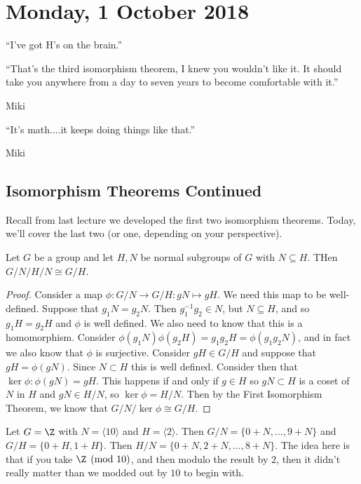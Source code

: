 \section{Monday, 1 October 2018}

\epigraph{``I've got H's on the brain.''}{}

\epigraph{``That's the third isomorphism theorem, I knew you wouldn't like it. It should take you anywhere from a day to seven years to become comfortable with it.''}{Miki}

\epigraph{``It's math....it keeps doing things like that.''}{Miki}

\subsection{Isomorphism Theorems Continued}

Recall from last lecture we developed the first two isomorphism theorems. Today, we'll cover the last two (or one, depending on your perspective).

\begin{theorem}
Let $G$ be a group and let $H,N$ be normal subgroups of $G$ with $N \subseteq H$. THen $G/N \big/ H/N \cong G/H$.
\end{theorem}

\begin{proof}
Consider a map $\phi : G/N \to G/H : gN \mapsto gH$. We need this map to be well-defined. Suppose that $g_1N = g_2N$. Then $g_1^{-1}g_2 \in N$, but $N \subseteq H$, and so $g_1H = g_2H$ and $\phi$ is well defined. We also need to know that this is a homomorphism. Consider $\phi(g_1N)\phi(g_2H) = g_1g_2H = \phi(g_1g_2N)$, and in fact we also know that $\phi$ is surjective. Consider $gH \in G/H$ and suppose that $gH = \phi(gN)$. Since $N \subset H$ this is well defined. Consider then that $\ker \phi : \phi(gN) = gH$. This happens if and only if $g \in H$ so $gN \subset H$ is a coset of $N$ in $H$ and $gN \in H/N$, so $\ker\phi = H/N$. Then by the First Isomorphism Theorem, we know that $G/N \big/ \ker\phi \cong G/H$.
\end{proof}

\begin{example}
Let $G = \Z$ with $N = \langle 10 \rangle$ and $H = \langle 2 \rangle$. Then $G/N = \{0 + N,\dotsc,9+N\}$ and $G/H = \{0 + H, 1 + H\}$. Then $H / N = \{0 + N, 2 + N,\dotsc,8 + N\}$. The idea here is that if you take $\Z \pmod{10}$, and then modulo the result by $2$, then it didn't really matter than we modded out by $10$ to begin with.
\end{example}


